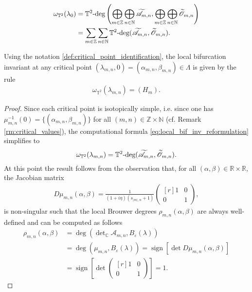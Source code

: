 \documentclass[10pt,a4paper]{amsart}
\def\bc{{\mathbb{C}}}
\def\bn{{\mathbb{N}}}
\def\br{{\mathbb{R}}}
\def\bt{{\mathbb{T}}}
\def\bz{{\mathbb{Z}}}
\def\t2deg{\mathbb T^2\text{\rm -deg}}
\def\wt{\widetilde}
\begin{document}
\begin{align}
\label{eq:local_bif_inv_reformulation}
\omega_{\bt^2}(\lambda_0) &= \t2deg\left( 
\bigoplus_{m \in \bz} \bigoplus_{n \in \bn}  \wt{\mathscr A}_{m,n}, \bigoplus_{m \in \bz} \bigoplus_{n \in \bn} \wt{\mathscr O}_{m,n} \right) \\ &= 
\sum_{m \in \bz} \sum_{n \in \bn} \t2deg(\wt{\mathscr A}_{m,n},  \wt{\mathscr O}_{m,n}). \nonumber
\end{align}

\begin{lemma} \label{lemm:local_bif_inv_comp_formula} \rm
Using the notation \eqref{def:critical_point_identification}, the local bifurcation invariant at any critical point $(\lambda_{m,n},0) = (\alpha_{m,n},\beta_{m,n}) \in \Lambda$ is given by the rule
\begin{align}
    \omega_{\bt^2}(\lambda_{m,n}) = (H_m).
\end{align}
\end{lemma}

\begin{proof}
Since each critical point is isotopically simple, i.e. since one has $\mu_{m,n}^{-1}(0) = \{ (\alpha_{m,n},\beta_{m,n})\}$ for all $(m,n) \in \bz \times \bn$ (cf. Remark \ref{rm:critical_values}), the computational formula \eqref{eq:local_bif_inv_reformulation} simplifies to
\begin{align*}
    \omega_{\bt^2}(\lambda_{m,n}) = \t2deg( \wt{\mathscr A}_{m,n}, \wt{\mathscr O}_{m,n}).
\end{align*}
At this point the result follows from the observation that, for all $(\alpha,\beta) \in \br \times \br$, the Jacobian matrix
\begin{align} \label{eq:Jacobian_mu_mnj}
 D \mu_{m,n}(\alpha,\beta) = 
 \frac{1}{(1+i\eta)(s_{|m|,n}+1)}\begin{pmatrix*}[r]
1 & 0 \\  0 & 1
\end{pmatrix*}, \end{align}
is non-singular such that the local Brouwer degrees $\rho_{m,n}(\alpha,\beta)$ are always well-defined and can be computed as follows
\begin{align} \label{eq:rho_mn_formula}
    \rho_{m,n}(\alpha,\beta)
    &= \deg( \det\nolimits_\bc \mathscr A_{m,n},B_{\varepsilon}(\lambda) ) \\ &= \deg(\mu_{m,n}, B_{\varepsilon}(\lambda)) = 
\operatorname{sign}\left[ \det  D \mu_{m,n}(\alpha,\beta)\right]  \nonumber \\ 
 &= \operatorname{sign}\left[  \det
 \begin{pmatrix*}[r]
1 & 0 \\ \nonumber  0 & 1
\end{pmatrix*}\right] = 1. \nonumber
\end{align}
\end{proof}
\end{document}
